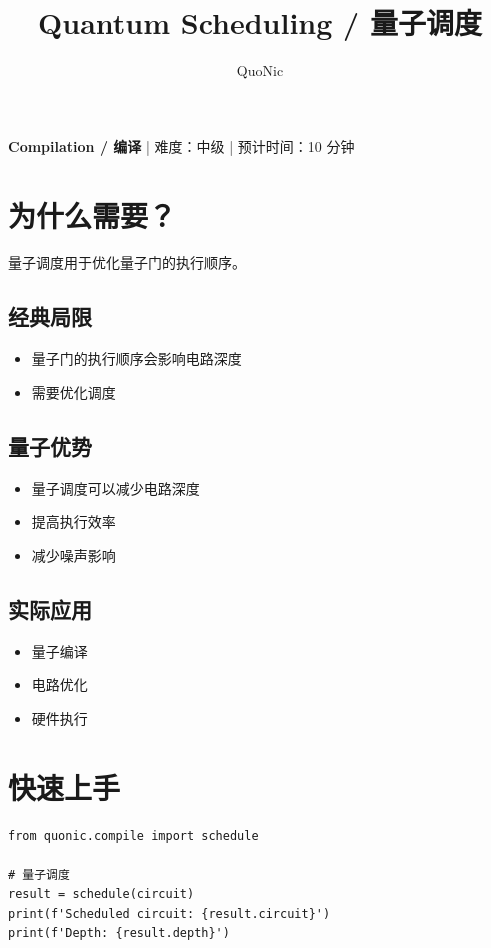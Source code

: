 \documentclass[12pt,a4paper]{article}
\title{Quantum Scheduling / 量子调度}
\author{QuoNic}
\date{}
\begin{document}
\maketitle

\begin{center}
\textbf{Compilation / 编译} | 难度：中级 | 预计时间：10 分钟
\end{center}

\tableofcontents
\newpage

\section{为什么需要？}

量子调度用于优化量子门的执行顺序。

\subsection{经典局限}
\begin{itemize}
  \item 量子门的执行顺序会影响电路深度
  \item 需要优化调度
\end{itemize}

\subsection{量子优势}
\begin{itemize}
  \item 量子调度可以减少电路深度
  \item 提高执行效率
  \item 减少噪声影响
\end{itemize}

\subsection{实际应用}
\begin{itemize}
  \item 量子编译
  \item 电路优化
  \item 硬件执行
\end{itemize}

\section{快速上手}

\begin{verbatim}
from quonic.compile import schedule

# 量子调度
result = schedule(circuit)
print(f'Scheduled circuit: {result.circuit}')
print(f'Depth: {result.depth}')
\end{verbatim}
\end{document}

